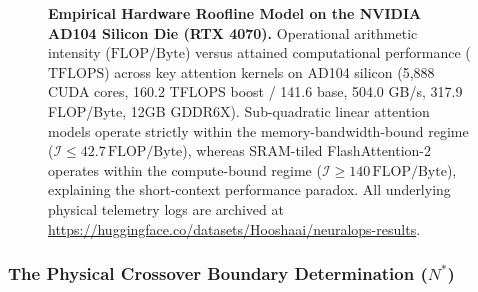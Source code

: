 \begin{figure}[t]
{}
\caption[Empirical Hardware Roofline Model on the NVIDIA AD104 Silicon Die (RTX 4070)]{\textbf{Empirical Hardware Roofline Model on the NVIDIA AD104 Silicon Die (RTX 4070).} Operational arithmetic intensity ($\text{FLOP/Byte}$) versus attained computational performance ($\text{TFLOPS}$) across key attention kernels on AD104 silicon (5,888 CUDA cores, 160.2 TFLOPS boost / 141.6 base, 504.0 GB/s, 317.9 FLOP/Byte, 12GB GDDR6X). Sub-quadratic linear attention models operate strictly within the memory-bandwidth-bound regime ($\mathcal{I} \le 42.7\,\text{FLOP/Byte}$), whereas SRAM-tiled FlashAttention-2 operates within the compute-bound regime ($\mathcal{I} \ge 140\,\text{FLOP/Byte}$), explaining the short-context performance paradox. All underlying physical telemetry logs are archived at \url{https://huggingface.co/datasets/Hooshaai/neuralops-results}.}
\label{fig:hardware_roofline_ad104}
\end{figure}

\subsubsection{The Physical Crossover Boundary Determination (\texorpdfstring{$N^*$}{N*})}
\label{sec:results_crossover_determination}

